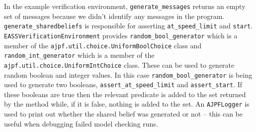 \begin{sloppypar}
In the example verification environment, \texttt{generate\_messages} returns an empty set of messages because we didn't identify any messages in the program.  \texttt{generate\_sharedbeliefs} is responsible for asserting \lstinline{at_speed_limit} and \lstinline{start}.  \texttt{EASSVerificationEnvironment} provides \texttt{random\_bool\_generator} which is a member of the \texttt{ajpf.util.choice.UniformBoolChoice} class and \texttt{random\_int\_generator} which is a member of the \texttt{ajpf.util.choice.UniformIntChoice} class.  These can be used to generate random boolean and integer values.  In this case \texttt{random\_bool\_generator} is being used to generate two booleans, \texttt{assert\_at\_speed\_limit} and \texttt{assert\_start}.  If these booleans are true then the relevant predicate is added to the set returned by the method while, if it is false, nothing is added to the set.  An \texttt{AJPFLogger} is used to print out whether the shared belief was generated or not -- this can be useful when debugging failed model checking runs.
\end{sloppypar}


